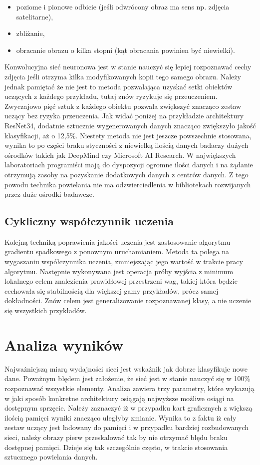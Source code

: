 \documentclass[12pt,a4paper,twoside,titlepage,openright]{book}
\begin{document}
\begin{itemize}
\item poziome i pionowe odbicie (jeśli odwrócony obraz ma sens np. zdjęcia satelitarne),
\item zbliżanie,
\item obracanie obrazu o kilka stopni (kąt obracania powinien być niewielki).
\end{itemize}

Konwolucyjna sieć neuronowa jest w stanie nauczyć się lepiej rozpoznawać cechy zdjęcia jeśli otrzyma kilka modyfikowanych kopii tego samego obrazu. Należy jednak pamiętać że nie jest to metoda pozwalająca uzyskać setki obiektów uczących z każdego przykładu, tutaj znów ryzykuje się przeuczeniem. Zwyczajowo pięć sztuk z każdego obiektu pozwala zwiększyć znacząco zestaw uczący bez ryzyka przeuczenia. 
Jak widać poniżej na przykładzie architektury ResNet34, dodatnie sztucznie wygenerowanych danych znacząco zwiększyło jakość klasyfikacji, aż o 12,5\%. Niestety metoda nie jest jeszcze powszechnie stosowana, wynika to po części braku styczności z niewielką ilością danych badaczy dużych ośrodków takich jak DeepMind czy Microsoft AI Research. W największych laboratoriach programiści mają do dyspozycji ogromne ilości danych i na żądanie otrzymują zasoby na pozyskanie dodatkowych danych z centrów danych. Z tego powodu technika powielania nie ma odzwierciedlenia w bibliotekach rozwijanych przez duże ośrodki badawcze. 

\subsection{Cykliczny współczynnik uczenia}
Kolejną techniką poprawienia jakości uczenia jest zastosowanie algorytmu gradientu spadkowego z ponownym uruchamianiem. Metoda ta polega na wygaszaniu współczynnika uczenia, zmniejszając jego wartość w trakcie pracy algorytmu. Następnie wykonywana jest operacja próby wyjścia z minimum lokalnego celem znalezienia prawidłowej przestrzeni wag, takiej która będzie cechowała się stabilnością dla większej gamy przykładów, prócz samej dokładności. Znów celem jest generalizowanie rozpoznawanej klasy, a nie uczenie się wszystkich przykładów. \cite{DBLP:journals/corr/HuangLPLHW17}

\section{Analiza wyników}
Najważniejszą miarą wydajności sieci jest wskaźnik jak dobrze klasyfikuje nowe dane. Poważnym błędem jest założenie, że sieć jest w stanie nauczyć się w 100\% rozpoznawać wszystkie elementy. Analiza zawiera trzy parametry, które wykazują w jaki sposób konkretne architektury osiągają najwyższe możliwe osiągi na dostępnym sprzęcie. Należy zaznaczyć iż w przypadku kart graficznych z większą ilością pamięci wyniki znacząco uległyby zmianie. Wynika to z faktu iż cały zestaw uczący jest ładowany do pamięci i w przypadku bardziej rozbudowanych sieci, należy obrazy pierw przeskalować tak by nie otrzymać błędu braku dostępnej pamięci. Dzieje się tak szczególnie często, w trakcie stosowania sztucznego powielania danych.
\end{document}
